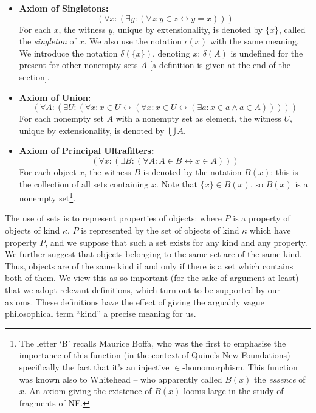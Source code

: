 \documentclass[12pt]{article}
\begin{document}
\begin{itemize}

\item {\bf Axiom of Singletons:}  $$(\forall x:(\exists y:(\forall z:y \in z \leftrightarrow y = x)))$$  For each $x$, the witness $y$, unique by extensionality, is denoted by $\{x\}$, called the {\em singleton} 
  of $x$.  We also use the notation $\iota(x)$ with the same meaning.
We introduce the notation $\delta(\{x\})$, denoting $x$;  $\delta(A)$ is undefined for the present for other nonempty sets $A$ [a definition is given at the end of the section].\marginpar{\textcolor{red}{this definition should be referenced}}

\item {\bf Axiom of Union:}  $$(\forall A:(\exists U:(\forall x:x \in U \leftrightarrow (\forall x:x \in U \leftrightarrow (\exists a:x \in a \wedge a \in A)))))$$   For each nonempty set $A$ with a nonempty set as element, the witness $U$, unique by extensionality, is denoted by $\bigcup A$.




\item {\bf Axiom of Principal Ultrafilters:}
  $$(\forall x:(\exists B:(\forall A:A \in B \leftrightarrow x \in A)))$$
  For each object $x$, the witness $B$ is denoted by the notation $B(x)$:  this is the collection of all sets containing $x$.   Note that $\{x\} \in B(x)$, so $B(x)$ is a nonempty set\footnote{The letter `B' recalls Maurice Boffa, who was the first to emphasise the importance of this function (in the context of Quine's New Foundations) -- specifically the fact that it's an injective $\in$-homomorphism.  This function was known also to Whitehead -- who apparently called $B(x)$ the {\sl essence} of $x$.  An axiom giving the existence of $B(x)$ looms large in the study of fragments of NF.}.
\end{itemize}

The use of sets is to represent properties of objects: where $P$ is a
property of objects of {kind} $\kappa$, $P$ is represented by the set of
objects of kind $\kappa$ which have property $P$, and we suppose that
such a set exists for any kind and any property.  We further suggest
that objects belonging to the same set are of the same kind.  Thus,
objects are of the same kind if and only if there is a set which
contains both of them.  We view this as so important (for the sake of
argument at least) that we adopt relevant definitions, which turn out
to be supported by our axioms.   These definitions have the effect of giving the arguably vague philosophical term ``kind'' a precise meaning for us.
\end{document}
